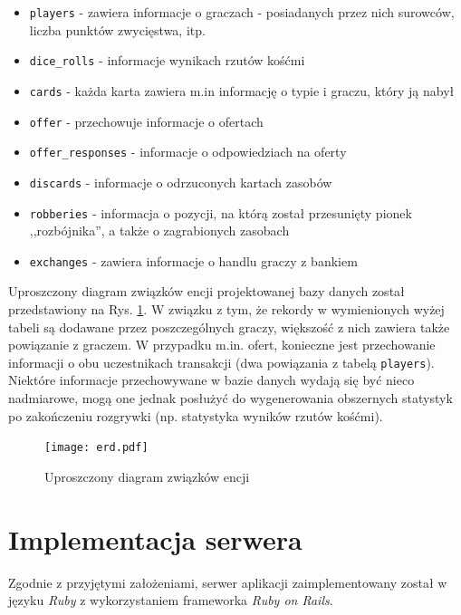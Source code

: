 \documentclass[11pt,twoside]{report}
\providecommand{\imref}[1]{Rys. \ref{#1}} %
\begin{document}
\begin{itemize}
\item \texttt{players} - zawiera informacje o graczach - posiadanych
  przez nich surowców, liczba punktów zwycięstwa, itp.
\item \texttt{dice\_rolls} - informacje wynikach rzutów
  kośćmi
\item \texttt{cards} - każda karta zawiera m.in informację o typie i
  graczu, który ją nabył
\item \texttt{offer} - przechowuje informacje o ofertach
\item \texttt{offer\_responses} - informacje o odpowiedziach na oferty
\item \texttt{discards} - informacje o odrzuconych kartach zasobów
\item \texttt{robberies} - informacja o pozycji, na którą został
  przesunięty pionek ,,rozbójnika'', a także o zagrabionych zasobach
\item \texttt{exchanges} - zawiera informacje o handlu graczy z
  bankiem
\end{itemize}

Uproszczony diagram związków encji projektowanej bazy danych został
przedstawiony na \imref{erd}. W związku z tym, że rekordy w
wymienionych wyżej tabeli są dodawane przez poszczególnych graczy,
większość z nich zawiera także powiązanie z graczem. W przypadku
m.in. ofert, konieczne jest przechowanie informacji o obu uczestnikach
transakcji (dwa powiązania z tabelą \texttt{players}). Niektóre
informacje przechowywane w bazie danych wydają się być nieco
nadmiarowe, mogą one jednak posłużyć do wygenerowania obszernych
statystyk po zakończeniu rozgrywki (np. statystyka wyników rzutów
kośćmi).

\begin{figure}[ht]
  \begin{center}
    \texttt{[image: erd.pdf]}
  \end{center}
  \caption{Uproszczony diagram związków encji}
  \label{erd}
\end{figure}

\cleardoublepage

\chapter{Implementacja serwera}

Zgodnie z przyjętymi założeniami, serwer aplikacji zaimplementowany
został w języku \emph{Ruby} z wykorzystaniem frameworka \emph{Ruby on
  Rails}.
\end{document}
